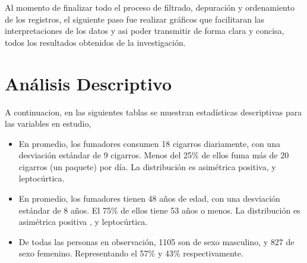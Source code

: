 \documentclass[
  stu,
  longtable,
  nolmodern,
  notxfonts,
  notimes,
  colorlinks=true,linkcolor=blue,citecolor=blue,urlcolor=blue]{apa7}
\begin{document}
Al momento de finalizar todo el proceso de filtrado, depuración y
ordenamiento de los registros, el siguiente paso fue realizar gráficos
que facilitaran las interpretaciones de los datos y asi poder transmitir
de forma clara y concisa, todos los resultados obtenidos de la
investigación.

\section{Análisis Descriptivo}\label{anuxe1lisis-descriptivo}

A continuacion, en las siguientes tablas se muestran estadísticas
descriptivas para las variables en estudio,

\begin{itemize}
\item
  En promedio, los fumadores consumen 18 cigarros diariamente, con una
  desviación estándar de 9 cigarros. Menos del 25\% de ellos fuma más de
  20 cigarros (un paquete) por día. La distribución es asimétrica
  positiva, y leptocúrtica.
\item
  En promedio, los fumadores tienen 48 años de edad, con una desviación
  estándar de 8 años. El 75\% de ellos tiene 53 años o menos. La
  distribución es asimétrica positiva , y leptocúrtica.
\item
  De todas las personas en observación, 1105 son de sexo masculino, y
  827 de sexo femenino. Representando el 57\% y 43\% respectivamente.
\end{itemize}
\end{document}
